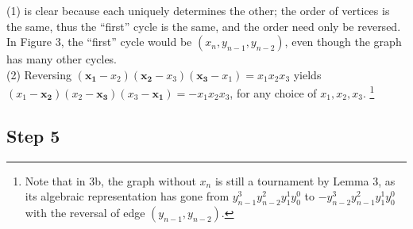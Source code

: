 \documentclass[11pt, oneside]{article} 	%
\begin{document}
(1) is clear because each uniquely determines the other; the order of vertices is the same, thus the ``first'' cycle is the same, and the order need only be reversed.  In Figure 3, the ``first'' cycle would be $(x_n, y_{n-1}, y_{n-2})$, even though the graph has many other cycles.
\\
(2) Reversing $(\mathbf{x_1} - x_2)(\mathbf{x_2}-x_3)(\mathbf{x_3}-x_1) = x_1x_2x_3$ yields $(x_1 - \mathbf{x_2})(x_2-\mathbf{x_3})(x_3-\mathbf{x_1}) = -x_1x_2x_3$, for any choice of $x_1, x_2, x_3$.  \footnote{Note that in 3b, the graph without $x_n$ is still a tournament by Lemma 3, as its algebraic representation has  gone from $y_{n-1}^3y_{n-2}^2y_{1}^1y_0^0$ to $-y_{n-2}^3y_{n-1}^2y_{1}^1y_0^0$ with the reversal of edge $(y_{n-1}, y_{n-2})$.}


\subsection{Step 5}
\end{document}

